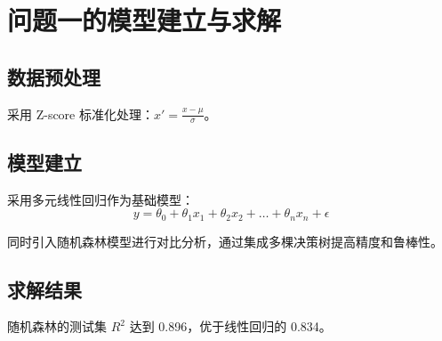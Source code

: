 \section{问题一的模型建立与求解}

\subsection{数据预处理}

采用 Z-score 标准化处理：$x' = \frac{x - \mu}{\sigma}$。

\subsection{模型建立}

采用多元线性回归作为基础模型：
\begin{equation}
y = \theta_0 + \theta_1 x_1 + \theta_2 x_2 + \dots + \theta_n x_n + \epsilon
  \label{eq:5-problem1-1}
\end{equation}

同时引入随机森林模型进行对比分析，通过集成多棵决策树提高精度和鲁棒性。

\subsection{求解结果}

随机森林的测试集 $R^2$ 达到 0.896，优于线性回归的 0.834。
